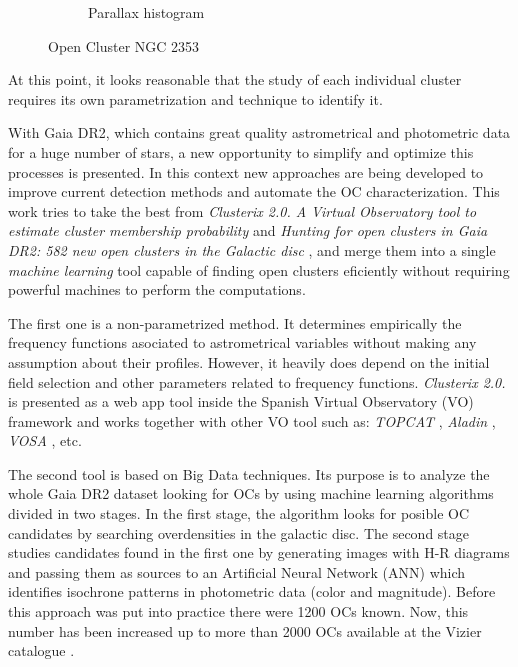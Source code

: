 \documentclass[11pt, a4paper, english]{book}
\begin{document}
\begin{figure}[htbp]
\begin{subfigure}[t]{0.45\textwidth}
    \caption{Parallax histogram}
    \label{fig:parallax_ngc_2353}
  \end{subfigure}
  \caption{Open Cluster NGC 2353}
\end{figure}

At this point, it looks reasonable that the study of each individual cluster requires its own parametrization and technique
to identify it.

With Gaia DR2, which contains great quality astrometrical and photometric data for a huge number of stars,
a new opportunity to simplify and optimize this processes is presented.
In this context new approaches are being developed to improve current detection methods and automate the OC characterization.
This work tries to take the best from \emph{Clusterix 2.0. A Virtual Observatory tool to estimate cluster membership probability}
\cite[]{balaguer2020clusterix} and \emph{Hunting for open clusters in Gaia DR2: 582 new open clusters
in the Galactic disc} \cite[]{castro2020hunting}, and merge them into a single \emph{machine learning}
tool capable of finding open clusters eficiently without requiring powerful machines to perform the computations.

The first one is a non-parametrized method. It determines empirically the frequency functions asociated to astrometrical variables
without making any assumption about their profiles. However, it heavily does depend on the initial field selection and other
parameters related to frequency functions. \emph{Clusterix 2.0.} is presented as a web app tool inside the Spanish Virtual Observatory
(VO) framework and works together with other VO tool such as:
\emph{TOPCAT} \cite[][\url{http://www.starlink.ac.uk/topcat/}]{taylor2005topcat},
\emph{Aladin} \cite[][\url{https://aladin.u-strasbg.fr/aladin.gml}]{bonnarel2000aladin},
\emph{VOSA} \cite[][\url{http://svo2.cab.inta-csic.es/theory/vosa/}]{bayo2008vosa}, etc.

The second tool is based on Big Data techniques. Its purpose is to analyze the whole Gaia DR2 dataset looking for OCs by using
machine learning algorithms divided in two stages. In the first stage, the algorithm looks for posible OC candidates by searching
overdensities in the galactic disc.
The second stage studies candidates found in the first one by generating images with H-R diagrams and passing them
as sources to an Artificial Neural Network (ANN) which identifies isochrone patterns in photometric data (color and magnitude).
Before this approach was put into practice there were 1200 OCs known. Now, this number has been increased up to more than 2000 OCs
available at the Vizier catalogue \cite[][\url{https://vizier.unistra.fr}]{ochsenbein2000vizier}.
\end{document}
